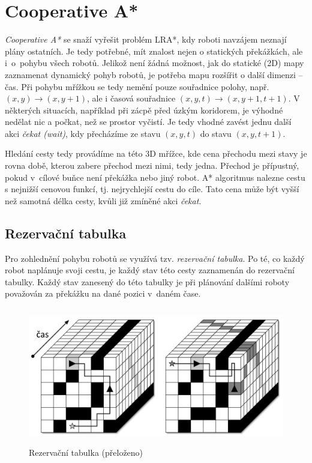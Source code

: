 \section{Cooperative A*}\label{sec:Coop}
\emph{Cooperative A*} \cite{Silver2005,Silver2006} se snaží vyřešit problém LRA*, kdy roboti navzájem neznají plány ostatních. Je tedy potřebné, mít znalost nejen o statických překážkách, ale i~o~pohybu všech robotů. Jelikož není žádná možnost, jak do statické (2D) mapy zaznamenat dynamický pohyb robotů, je potřeba mapu rozšířit o další dimenzi -- čas. Při pohybu mřížkou se tedy nemění pouze souřadnice polohy, např. $\left(x,y\right)\to\left(x,y+1\right)$, ale i časová souřadnice $\left(x,y,t\right)\to\left(x,y+1,t+1\right)$. V některých situacích, například při zácpě před úzkým koridorem, je výhodné nedělat nic a počkat, než se prostor vyčistí. Je tedy vhodné zavést jednu další akci \emph{čekat (wait)}, kdy přecházíme ze stavu $\left(x,y,t\right)$ do stavu $\left(x,y,t+1\right)$.

Hledání cesty tedy provádíme na této 3D mřížce, kde cena přechodu mezi stavy je rovna době, kterou zabere přechod mezi nimi, tedy jedna. Přechod je přípustný, pokud v~cílové buňce není překážka nebo jiný robot.
A* algoritmus nalezne cestu s nejnižší cenovou funkcí, tj. nejrychlejší cestu do cíle. Tato cena může být vyšší než samotná délka cesty, kvůli již zmíněné akci \emph{čekat}. 

\subsection{Rezervační tabulka}\label{sec:reservationTable}

Pro zohlednění pohybu robotů se využívá tzv. \emph{rezervační tabulka}. Po té, co každý robot naplánuje svoji cestu, je každý stav této cesty zaznamenán do rezervační tabulky. Každý stav zanesený do této tabulky je při plánování dalšími roboty považován za překážku na dané pozici v~daném čase. 

\begin{figure}[htb]
	\begin{center}
		\includegraphics*[width=15cm,height=6cm,keepaspectratio]{obr/reservationTable2}
	\end{center}
	\caption[caption]{Rezervační tabulka \cite{Silver2006} (přeloženo)}
	\label{obr:reservationTable}
\end{figure}

